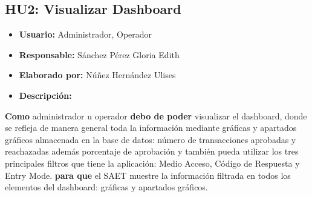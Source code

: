 \subsection{HU2: Visualizar Dashboard}
\begin{itemize}
	\item \textbf{Usuario:} Administrador, Operador
	\item \textbf{Responsable:} Sánchez Pérez Gloria Edith
	\item \textbf{Elaborado por:} Núñez Hernández Ulises
	\item \textbf{Descripción:}
\end{itemize}
\textbf{Como} administrador u operador \textbf{debo de poder} visualizar el dashboard, donde se refleja de manera general toda la información mediante gráficas y apartados gráficos almacenada en la base de datos: número de transacciones aprobadas y reachazadas además porcentaje de aprobación y también pueda utilizar los tres principales filtros que tiene la aplicación: Medio Acceso, Código de Respuesta y Entry Mode. \textbf{para que} el SAET muestre la información filtrada en todos los elementos del dashboard: gráficas y apartados gráficos.
